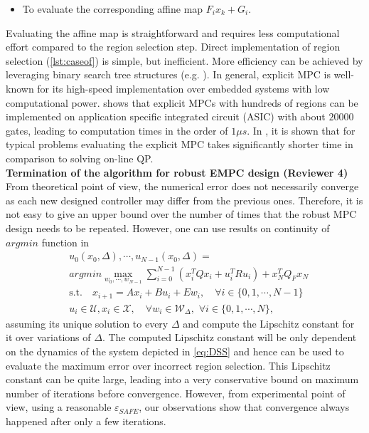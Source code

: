 {\begin{itemize}
\item To evaluate the corresponding affine map $F_i x_k +G_i$. 
\end{itemize}
Evaluating the affine map is straightforward and requires less computational effort compared to the region selection step. Direct implementation of region selection (\autoref{lst:caseof}) is simple, but inefficient. More efficiency can be achieved by leveraging binary search tree structures (e.g. \cite{Mnnigmann:2011}). In general, explicit MPC is well-known for its high-speed implementation over embedded systems with low computational power. \cite{Johansen:2007} shows that explicit MPCs with hundreds of regions can be implemented on application specific integrated circuit (ASIC) with about $20000$ gates, leading to computation times in the order of $1\mu s$. In \cite{Bemporad:2006}, it is shown that for typical problems evaluating the explicit MPC takes significantly shorter time in comparison to solving on-line QP. \\
\textbf{Termination of the algorithm for robust EMPC design (Reviewer 4)}\\
From theoretical point of view, the numerical error does not necessarily converge as each new designed controller may differ from the previous ones. Therefore, it is not easy to give an upper bound over the number of times that the robust MPC design needs to be repeated. However, one can use results on continuity of $argmin$ function in 
\begin{align*}
\label{eq:argmin}
&u_0(x_0,\Delta),\cdots,u_{N-1}(x_0,\Delta)=\\
&argmin \max_{w_0,\cdots,w_{N-1}} \sum_{i=0}^{N-1}(x_i^TQx_i+u_i^TRu_i) + x_N^TQ_Fx_N\nonumber\\
&\text{s.t.} \quad x_{i+1}=Ax_i+Bu_i + E w_i, \quad\forall i\in\{0,1,\cdots,N-1\}\nonumber\\
&u_i\in\mathcal{U},x_i\in\mathcal{X},\quad \forall w_i\in\mathcal{W}_{\Delta},\,\,\forall i\in\{0,1,\cdots,N\},
\end{align*}
 assuming its unique solution to every $\Delta$ and compute the Lipschitz constant for it over variations of $\Delta$. The computed Lipschitz constant will be only dependent on the dynamics of the system depicted in \autoref{eq:DSS} and hence can be used to evaluate the maximum error over incorrect region selection. This Lipschitz constant can be quite large, leading into a very conservative bound on maximum number of iterations before convergence. However, from experimental point of view, using a reasonable $\varepsilon_{SAFE}$, our observations show that convergence always happened after only a few iterations.
}
